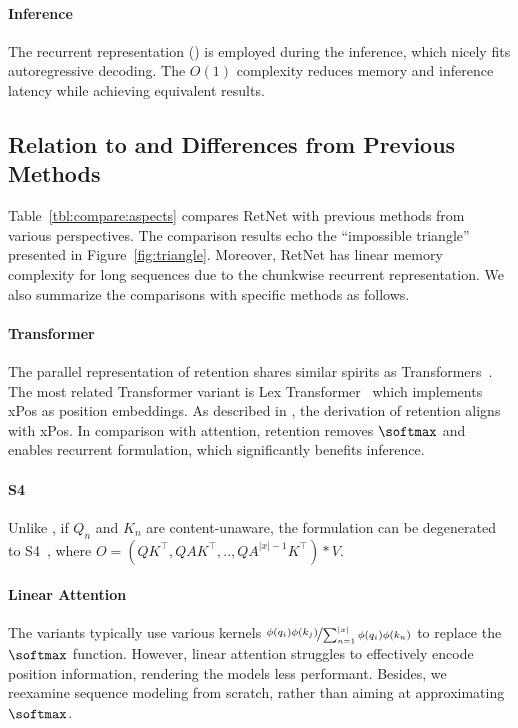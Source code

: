 \documentclass{article}
\newcommand\our{RetNet}
\begin{document}
\paragraph{Inference}
The recurrent representation () is employed during the inference, which nicely fits autoregressive decoding.
The $O(1)$ complexity reduces memory and inference latency while achieving equivalent results.


\subsection{Relation to and Differences from Previous Methods}

Table~\ref{tbl:compare:aspects} compares \our{} with previous methods from various perspectives.
The comparison results echo the ``impossible triangle'' presented in Figure~\ref{fig:triangle}.
Moreover, \our{} has linear memory complexity for long sequences due to the chunkwise recurrent representation.
We also summarize the comparisons with specific methods as follows.

\paragraph{Transformer}
The parallel representation of retention shares similar spirits as Transformers~\cite{transformer}.
The most related Transformer variant is Lex Transformer~\cite{lex} which implements xPos as position embeddings.
As described in , the derivation of retention aligns with xPos.
In comparison with attention, retention removes $\softmax$ and enables recurrent formulation, which significantly benefits inference.

\paragraph{S4}
Unlike , if $Q_n$ and $K_n$ are content-unaware, the formulation can be degenerated to S4~\cite{s4}, where $O = (Q K^\intercal, Q A K^\intercal, .., Q A^{|x|-1} K^\intercal) * V$.

\paragraph{Linear Attention}
The variants typically use various kernels $\nicefrac{\phi(q_i)\phi(k_j)}{\sum_{n=1}^{|x|}\phi(q_i)\phi(k_n)}$ to replace the $\softmax$ function.
However, linear attention struggles to effectively encode position information, rendering the models less performant.
Besides, we reexamine sequence modeling from scratch, rather than aiming at approximating $\softmax$.
\end{document}
